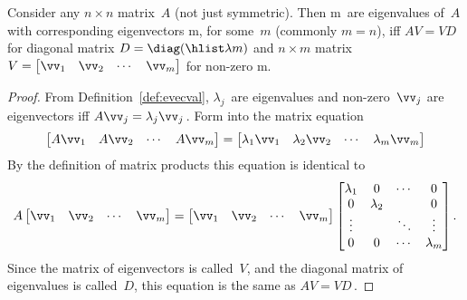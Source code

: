 \begin{theorem} \label{thm:avvd}
Consider any \(n\times n\) matrix~\(A\) (not just symmetric).
Then \hlist\lambda m\ are eigenvalues of~\(A\) with corresponding eigenvectors \hlist\vv m, for some~\(m\) (commonly \(m=n\)), iff \(AV=VD\) for diagonal matrix \(D=\diag(\hlist\lambda m)\) and \(n\times m\) matrix \(V=\begin{bmatrix} \vv_1&\vv_2&\cdots&\vv_m \end{bmatrix}\) for non-zero \hlist\vv m.
\end{theorem}

\begin{proof} 
From Definition~\ref{def:evecval}, \(\lambda_j\)~are eigenvalues and non-zero~\(\vv_j\) are eigenvectors iff \(A\vv_j=\lambda_j\vv_j\)\,.
Form into the matrix equation
\begin{equation*}
\begin{bmatrix} A\vv_1&A\vv_2&\cdots&A\vv_m \end{bmatrix}
=\begin{bmatrix} \lambda_1\vv_1&\lambda_2\vv_2&\cdots&\lambda_m\vv_m \end{bmatrix}
\end{equation*}
By the definition of matrix products this equation is identical to
\begin{equation*}
A\begin{bmatrix} \vv_1&\vv_2&\cdots&\vv_m \end{bmatrix}
=\begin{bmatrix} \vv_1&\vv_2&\cdots&\vv_m \end{bmatrix}
\begin{bmatrix} \lambda_1&0&\cdots&0
\\0&\lambda_2&&0
\\\vdots&&\ddots&\vdots
\\0&0&\cdots&\lambda_m \end{bmatrix}.
\end{equation*}
Since the matrix of eigenvectors is called~\(V\), and the diagonal matrix of eigenvalues is called~\(D\), this equation is the same as \(AV=VD\)\,.
\end{proof}



